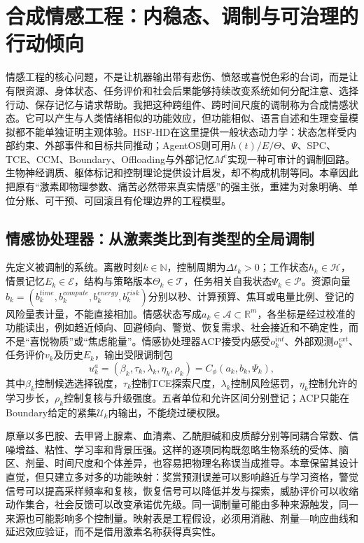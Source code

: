 \chapter{合成情感工程：内稳态、调制与可治理的行动倾向}
\label{chp:synthetic_affective_engineering}

情感工程的核心问题，不是让机器输出带有悲伤、愤怒或喜悦色彩的台词，而是让有限资源、身体状态、任务评价和社会后果能够持续改变系统如何分配注意、选择行动、保存记忆与请求帮助。我把这种跨组件、跨时间尺度的调制称为合成情感状态。它可以产生与人类情绪相似的功能效应，但功能相似、语言自述和生理变量模拟都不能单独证明主观体验。HSF-HD在这里提供一般状态动力学：状态怎样受内部约束、外部事件和目标共同推动；AgentOS则可用$h(t)/E/\Theta$、$\Psi$、SPC、TCE、CCM、Boundary、Offloading与外部记忆$M^e$实现一种可审计的调制回路。生物神经调质、躯体标记和控制理论提供设计启发，却不构成机制等同。本章因此把原有“激素即物理参数、痛苦必然带来真实情感”的强主张，重建为对象明确、单位分账、可干预、可回滚且有伦理边界的工程模型。

\section{情感协处理器：从激素类比到有类型的全局调制}
\label{sec:affective_coprocessor}

先定义被调制的系统。离散时刻$k\in\mathbb N$，控制周期为$\Delta t_k>0$；工作状态$h_k\in\mathcal H$，情景记忆$E_k\in\mathcal E$，结构与策略版本$\Theta_k\in\mathcal T$，任务相关自我状态$\Psi_k\in\mathcal P$。资源向量$b_k=(b_k^{time},b_k^{compute},b_k^{energy},b_k^{risk})$分别以秒、计算预算、焦耳或电量比例、登记的风险量表计量，不能直接相加。情感状态写成$a_k\in\mathcal A\subset\mathbb R^m$，各坐标是经过校准的功能读出，例如趋近倾向、回避倾向、警觉、恢复需求、社会接近和不确定性，而不是“喜悦物质”或“焦虑能量”。情感协处理器ACP接受内感受$o_k^{int}$、外部观测$o_k^{ext}$、任务评价$v_k$及历史$E_k$，输出受限调制包
\begin{equation}
u_k^a=(\beta_k,\tau_k,\lambda_k,\eta_k,\rho_k)=C_\phi(a_k,b_k,\Psi_k),
\end{equation}
其中$\beta_k$控制候选选择锐度，$\tau_k$控制TCE探索尺度，$\lambda_k$控制风险惩罚，$\eta_k$控制允许的学习步长，$\rho_k$控制复核与升级强度。五者单位和允许区间分别登记；ACP只能在Boundary给定的紧集$\mathcal U_k$内输出，不能绕过硬权限。

原章以多巴胺、去甲肾上腺素、血清素、乙酰胆碱和皮质醇分别等同耦合常数、信噪增益、粘性、学习率和背景压强。这样的逐项同构既忽略生物系统的受体、脑区、剂量、时间尺度和个体差异，也容易把物理名称误当成推导。本章保留其设计直觉，但只建立多对多的功能映射：奖赏预测误差可以影响趋近与学习资格，警觉信号可以提高采样频率和复核，恢复信号可以降低并发与探索，威胁评价可以收缩动作集合，社会反馈可以改变承诺优先级。同一调制量可能由多种来源触发，同一来源也可能影响多个控制量。映射表是工程假设，必须用消融、剂量—响应曲线和延迟效应验证，而不是借用激素名称获得真实性。

